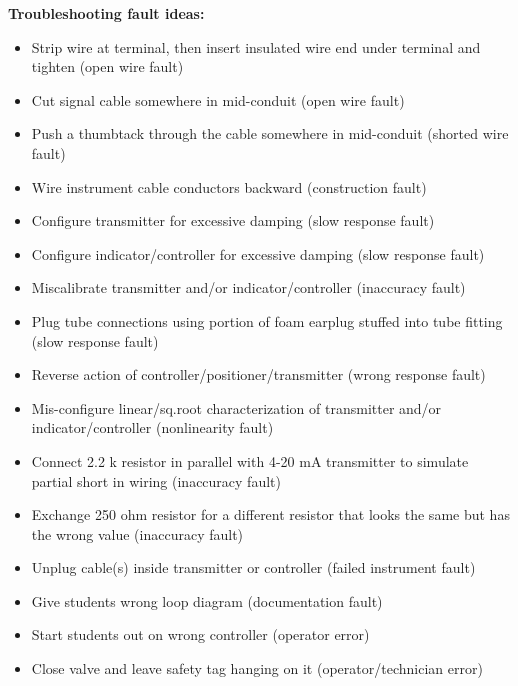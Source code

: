 \documentclass[12pt,a4paper]{article}
\begin{document}
\noindent
{\bf Troubleshooting fault ideas:}

\begin{itemize}
\goodbreak
\item{} Strip wire at terminal, then insert insulated wire end under terminal and tighten (open wire fault)
\item{} Cut signal cable somewhere in mid-conduit (open wire fault)
\item{} Push a thumbtack through the cable somewhere in mid-conduit (shorted wire fault)
\item{} Wire instrument cable conductors backward (construction fault)
\item{} Configure transmitter for excessive damping (slow response fault)
\item{} Configure indicator/controller for excessive damping (slow response fault)
\item{} Miscalibrate transmitter and/or indicator/controller (inaccuracy fault)
\item{} Plug tube connections using portion of foam earplug stuffed into tube fitting (slow response fault)
\item{} Reverse action of controller/positioner/transmitter (wrong response fault)
\item{} Mis-configure linear/sq.root characterization of transmitter and/or indicator/controller (nonlinearity fault)
\item{} Connect 2.2 k resistor in parallel with 4-20 mA transmitter to simulate partial short in wiring (inaccuracy fault)
\item{} Exchange 250 ohm resistor for a different resistor that looks the same but has the wrong value (inaccuracy fault) 
\item{} Unplug cable(s) inside transmitter or controller (failed instrument fault)
\item{} Give students wrong loop diagram (documentation fault)
\item{} Start students out on wrong controller (operator error)
\item{} Close valve and leave safety tag hanging on it (operator/technician error)
\end{itemize}













\vfil \eject
\end{document}
